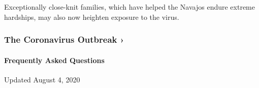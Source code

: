 Exceptionally close-knit families, which have helped the Navajos endure
extreme hardships, may also now heighten exposure to the virus.

\href{https://www.nytimes3xbfgragh.onion/news-event/coronavirus?action=click\&pgtype=Article\&state=default\&region=MAIN_CONTENT_3\&context=storylines_faq}{}

\hypertarget{the-coronavirus-outbreak-}{%
\subsubsection{The Coronavirus Outbreak
›}\label{the-coronavirus-outbreak-}}

\hypertarget{frequently-asked-questions}{%
\paragraph{Frequently Asked
Questions}\label{frequently-asked-questions}}

Updated August 4, 2020

